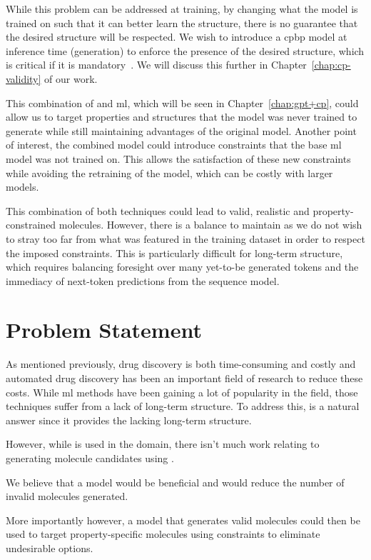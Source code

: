 \documentclass[../Document.tex]{subfiles}
\begin{document}
While this problem can be addressed at training, by changing what the model is trained on such that it can better learn the structure, there is no guarantee that the desired structure will be respected. 
We wish to introduce a \gls{cpbp} model at inference time (generation) to enforce the presence of the desired structure, which is critical if it is mandatory~\cite{deutsch2019general,lee2019gradient}. We will discuss this further in Chapter~\ref{chap:cp-validity} of our work.

This combination of \cp and \gls{ml}, which will be seen in Chapter~\ref{chap:gpt+cp}, could allow us to target properties and structures that the model was never trained to generate while still maintaining advantages of the original model.
Another point of interest, the combined model could introduce constraints that the base \gls{ml} model was not trained on.
This allows the satisfaction of these new constraints while avoiding the retraining of the model, which can be costly with larger models.

This combination of both techniques could lead to valid, realistic and property-constrained molecules. However, there is a balance to maintain as we do not wish to stray too far from what was featured in the training dataset in order to respect the imposed constraints. This is particularly difficult for long-term structure, which requires balancing foresight over many yet-to-be generated tokens and the immediacy of next-token predictions from the sequence model.


\section{Problem Statement}
\label{sec:intro/problem}

As mentioned previously, drug discovery is both time-consuming and costly and automated drug discovery has been an important field of research to reduce these costs.
While \gls{ml} methods have been gaining a lot of popularity in the field, those techniques suffer from a lack of long-term structure.
To address this, \cp is a natural answer since it provides the lacking long-term structure.

However, while \cp is used in the domain, there isn't much work relating to generating molecule candidates using \cp.

We believe that a \cp model would be beneficial and would reduce the number of invalid molecules generated.

More importantly however, a \cp model that generates valid molecules could then be used to target property-specific molecules using constraints to eliminate undesirable options.
\end{document}
